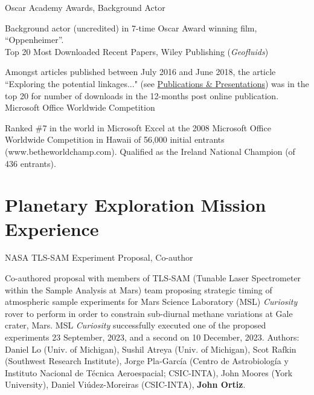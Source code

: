 \documentclass[11pt, letterpaper]{article}
\newcommand{\years}[1]{\marginnote{\scriptsize #1}}
\begin{document}
\years{2024}Oscar Academy Awards, Background Actor 

    Background actor (uncredited) in 7-time Oscar Award winning film, ``Oppenheimer''. \\

\years{2018}Top 20 Most Downloaded Recent Papers, Wiley Publishing (\emph{Geofluids})

	Amongst articles published between July 2016 and June 2018, the article
	``Exploring the potential linkages..." (see
	\hyperref[sec:pubs]{Publications \& Presentations}) was in the top 20 for
	number of downloads in the 12-months post online publication.\\

    
\years{2008}Microsoft Office Worldwide Competition 

    Ranked \#7 in the world in Microsoft Excel at the 2008 Microsoft Office
    Worldwide Competition in Hawaii of 56,000 initial entrants
    (www.betheworldchamp.com). Qualified as the Ireland National Champion (of
    436 entrants).

\section*{Planetary Exploration Mission Experience}
\label{sec:missions}  %
\noindent
\years{2023}NASA TLS-SAM Experiment Proposal, Co-author

    Co-authored proposal with members of TLS-SAM (Tunable Laser Spectrometer
    within the Sample Analysis at Mars) team proposing strategic timing of
    atmospheric sample experiments for Mars Science Laboratory (MSL)
    \textit{Curiosity} rover to perform in order to constrain sub-diurnal
    methane variations at Gale crater, Mars. MSL \textit{Curiosity}
    successfully executed one of the proposed experiments 23 September, 2023,
    and a second on 10 December, 2023. Authors: Daniel Lo (Univ. of Michigan),
    Sushil Atreya (Univ. of Michigan), Scot Rafkin (Southwest Research
    Institute), Jorge Pla-Garc\'{i}a (Centro de Astrobiolog\'{i}a y Instituto
    Nacional de T\'{e}cnica Aeroespacial; CSIC-INTA), John Moores (York
    University), Daniel Vi\'{u}dez-Moreiras (CSIC-INTA), \textbf{John Ortiz}.
\end{document}
